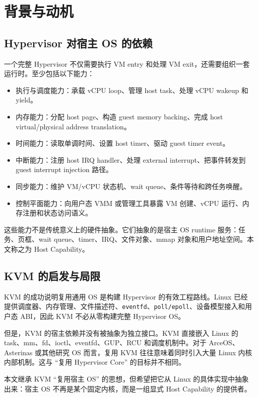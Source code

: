 \documentclass[a4paper,11pt]{article}
\begin{document}
\section{背景与动机}

\subsection{Hypervisor 对宿主 OS 的依赖}

一个完整 Hypervisor 不仅需要执行 VM entry 和处理 VM exit，还需要组织一套运行时。至少包括以下能力：

\begin{itemize}
  \item 执行与调度能力：承载 vCPU loop、管理 host task、处理 vCPU wakeup 和 yield。
  \item 内存能力：分配 host page、构造 guest memory backing、完成 host virtual/physical address translation。
  \item 时间能力：读取单调时间、设置 host timer、驱动 guest timer event。
  \item 中断能力：注册 host IRQ handler、处理 external interrupt、把事件转发到 guest interrupt injection 路径。
  \item 同步能力：维护 VM/vCPU 状态机、wait queue、条件等待和跨任务唤醒。
  \item 控制平面能力：向用户态 VMM 或管理工具暴露 VM 创建、vCPU 运行、内存注册和状态访问语义。
\end{itemize}

这些能力不是传统意义上的硬件抽象。它们抽象的是宿主 OS runtime 服务：任务、页框、wait queue、timer、IRQ、文件对象、mmap 对象和用户地址空间。本文称之为 Host Capability。

\subsection{KVM 的启发与局限}

KVM 的成功说明复用通用 OS 是构建 Hypervisor 的有效工程路线。Linux 已经提供调度器、内存管理、文件描述符、\texttt{eventfd}、\texttt{poll/epoll}、设备模型接入和用户态 ABI，因此 KVM 不必从零构建完整 Hypervisor OS。

但是，KVM 的宿主依赖并没有被抽象为独立接口。KVM 直接嵌入 Linux 的 task、mm、fd、ioctl、eventfd、GUP、RCU 和调度机制中。对于 ArceOS、Asterinas 或其他研究 OS 而言，复用 KVM 往往意味着同时引入大量 Linux 内核内部机制。这与 ``复用 Hypervisor Core'' 的目标并不相同。

本文继承 KVM ``复用宿主 OS'' 的思想，但希望把它从 Linux 的具体实现中抽象出来：宿主 OS 不再是某个固定内核，而是一组显式 Host Capability 的提供者。
\end{document}
